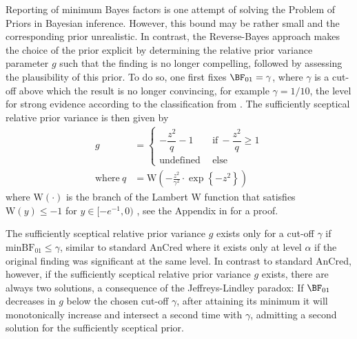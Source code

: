 Reporting of minimum Bayes factors is one attempt of solving the Problem of
Priors in Bayesian inference. However, this bound may be rather small and the
corresponding prior unrealistic. In contrast, the Reverse-Bayes approach makes
the choice of the prior explicit by determining the relative prior variance
parameter $g$ such that the finding is no longer compelling, followed by
assessing the plausibility of this prior. To do so, one first fixes
$\BF_{01} = \gamma$, where $\gamma$ is a cut-off above which the result is no
longer convincing, for example $\gamma = 1/10$, the level for strong evidence
according to the classification from \citet{Jeffreys1961}. The sufficiently
sceptical relative prior variance is then given by
\begin{align}
\label{ggamma}
  g &=
  \begin{cases}
    -\dfrac{z^2}{q} - 1
    & ~~ \text{if} ~
    -\dfrac{z^2}{q} \geq 1 \\
    \text{undefined} & ~~ \text{else}
  \end{cases} \\
  \text{where} ~ q &=
  \mathrm{W} \left(-\frac{z^2}{\gamma^2} \cdot
  \exp\left\{-z^2\right\}\right)
  \nonumber
\end{align}
where $\mathrm{W}(\cdot)$ is the branch of the Lambert W function that satisfies
$\mathrm{W}(y) \leq -1$ for \mbox{$y \in [-e^{-1}, 0)$} \citep{Corless1996}, see
the Appendix in \citep{Pawel2020b} for a proof.

The sufficiently sceptical relative prior variance $g$ exists only for a cut-off
$\gamma$ if $\text{minBF}_{01} \leq \gamma$, similar to standard AnCred where it
exists only at level $\alpha$ if the original finding was significant at the
same level. In contrast to standard AnCred, however, if the sufficiently
sceptical relative prior variance $g$ exists, there are always two solutions, a
consequence of the Jeffreys-Lindley paradox: If $\BF_{01}$ decreases in $g$
below the chosen cut-off $\gamma$, after attaining its minimum it will
monotonically increase and intersect a second time with $\gamma$, admitting a
second solution for the sufficiently sceptical prior.


